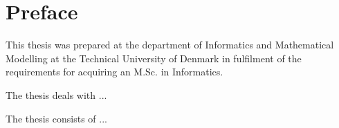 \chapter{Preface}

This thesis was prepared at the department of Informatics and Mathematical Modelling at the Technical University of Denmark in fulfilment of the
requirements for acquiring an M.Sc. in Informatics.

The thesis deals with ...

The thesis consists of ...
